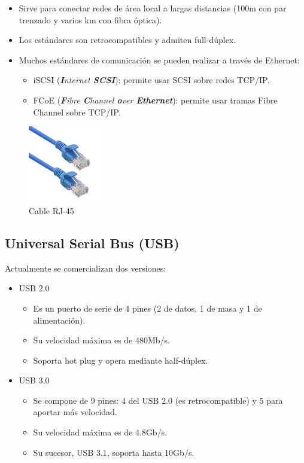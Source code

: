 \documentclass[12pt,spanish]{article}
\begin{document}
\begin{itemize}
	\item Sirve para conectar redes de área local a largas distancias (100m con par trenzado y varios km con fibra óptica).
	\item Los estándares son retrocompatibles y admiten full-dúplex.
	\item Muchos estándares de comunicación se pueden realizar a través de Ethernet:
	\begin{itemize}
		\item iSCSI (\textit{\textbf{I}nternet \textbf{SCSI}}): permite usar SCSI sobre redes TCP/IP.
		\item FCoE (\textit{\textbf{F}ibre \textbf{C}hannel \textbf{o}ver \textbf{Ethernet}}): permite usar tramas Fibre Channel sobre TCP/IP.
	\end{itemize}
\end{itemize}

\begin{figure}[H]
	\centering
	\includegraphics[width=0.3\textwidth]{rj45.jpg}
	\caption{Cable RJ-45}
\end{figure}

\subsection{Universal Serial Bus (USB)}

Actualmente se comercializan dos versiones:
\begin{itemize}
	\item USB 2.0
	\begin{itemize}
		\item Es un puerto de serie de 4 pines (2 de datos, 1 de masa y 1 de alimentación).
		\item Su velocidad máxima es de 480Mb/s.
		\item Soporta hot plug y opera mediante half-dúplex.
	\end{itemize}
	\item USB 3.0
	\begin{itemize}
		\item Se compone de 9 pines: 4 del USB 2.0 (es retrocompatible) y 5 para aportar más velocidad.
		\item Su velocidad máxima es de 4.8Gb/s.
		\item Su sucesor, USB 3.1, soporta hasta 10Gb/s.
	\end{itemize}
\end{itemize}
\end{document}

